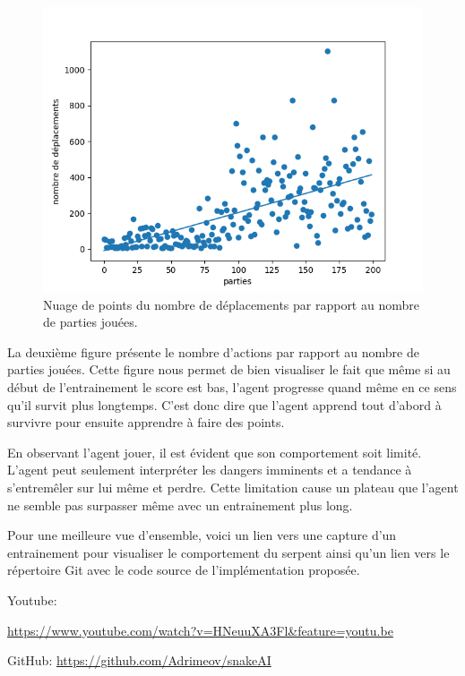 \documentclass{article}
\begin{document}
\begin{figure}[ht]
	\includegraphics[width=\linewidth]{moves_per_game_200.png}
	\caption{Nuage de points du nombre de déplacements par rapport au nombre de parties jouées.}
	\label{fig:Snake}
\end{figure}

La deuxième figure présente le nombre d'actions par rapport au nombre de parties jouées. Cette figure nous permet de bien visualiser le fait que même si au début de l'entrainement le score est bas, l'agent progresse quand même en ce sens qu'il survit plus longtemps. C'est donc dire que l'agent apprend tout d'abord à survivre pour ensuite apprendre à faire des points.  

En observant l'agent jouer, il est évident que son comportement soit limité. L'agent peut seulement interpréter les dangers imminents et a tendance à s'entremêler sur lui même et perdre. Cette limitation cause un plateau que l'agent ne semble pas surpasser même avec un entrainement plus long.


Pour une meilleure vue d'ensemble, voici un lien vers une capture d’un entrainement pour visualiser le comportement du serpent ainsi qu'un lien vers le répertoire Git avec le code source de l'implémentation proposée.

Youtube:

\scriptsize\href{https://www.youtube.com/watch?v=HNeuuXA3Flg&feature=youtu.be}{https://www.youtube.com/watch?v=HNeuuXA3Fl\&feature=youtu.be}

GitHub: 
\href{https://github.com/Adrimeov/snakeAI}{https://github.com/Adrimeov/snakeAI}
\end{document}
